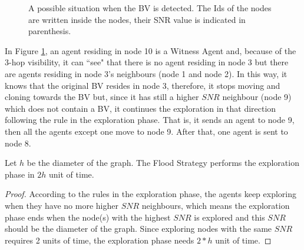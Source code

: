\begin{figure} [H]
\caption{A possible situation when the BV is detected. The Ids of the nodes are written inside the nodes, their SNR value is indicated in parenthesis.} 
  \label{fig:BVd} %
\end{figure}    

 
In Figure \ref{fig:BVd}, an agent residing in node 10 is a Witness Agent and, because of the 3-hop visibility, it can ``see" that there is no agent residing in node 3 but there are agents residing in node 3's neighbours  (node 1 and node 2). In this way, it knows that the original BV resides in node 3, therefore, it stops moving and cloning towards the BV but,  since it has still   a higher $SNR$ neighbour (node 9) which does not contain a BV,   it continues the exploration in that direction following the rule in the exploration phase. That is, it sends an agent to node 9, then all the agents except one move to node 9. After that, one agent is sent to node 8. 

\begin{theorem}
Let $h$ be  the diameter of the graph. The Flood Strategy performs the exploration phase in  $2h$ unit of time.
\end{theorem}
\begin{proof}
According to the rules in the exploration phase, the agents keep exploring when they have no more higher $SNR$ neighbours, which means the exploration phase ends when the node(s) with the highest $SNR$ is explored and this $SNR$ should be the diameter of the graph. Since exploring nodes with the same $SNR$ requires 2 units of time, the exploration phase needs $2*h$ unit of time.
\end{proof}


